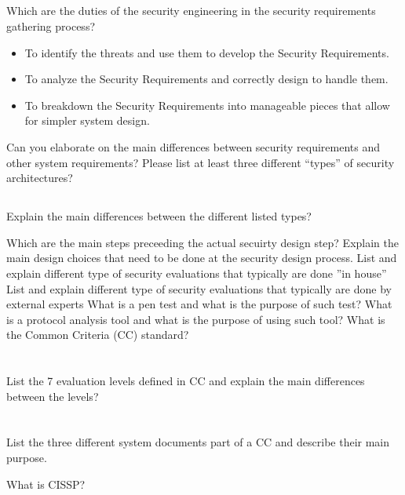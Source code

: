 \begin{questions}
\begin{parts}
  \part{} Which are the duties of the security engineering in the security requirements gathering process?
    \begin{solution}
      \begin{itemize}[noitemsep]
      \item To identify the threats and use them to develop the Security Requirements.
      \item To analyze the Security Requirements and correctly design to handle them.
      \item To breakdown the Security Requirements into manageable pieces that allow for simpler system design.
      \end{itemize}
    \end{solution}
  \end{parts}

\question{} Can you elaborate on the main differences between security requirements and other system requirements?
\question{} Please list at least three different “types” of security architectures?
  \begin{parts}
  \part{} Explain the main differences between the different listed types?
  \end{parts}

\question{} Which are the main steps preceeding the actual secuirty design step?
\question{} Explain the main design choices that need to be done at the security design process.
\question{} List and explain different type of security evaluations that typically are done ”in house”
\question{} List and explain different type of security evaluations that typically are done by external experts
\question{} What is a pen test and what is the purpose of such test?
\question{} What is a protocol analysis tool and what is the purpose of using such tool?
\question{} What is the Common Criteria (CC) standard?
  \begin{parts}
  \part{} List the 7 evaluation levels defined in CC and explain the main differences between the levels?
  \part{} List the three different system documents part of a CC and describe their main purpose.
  \end{parts}

\question{} What is CISSP?\@
\end{questions}

